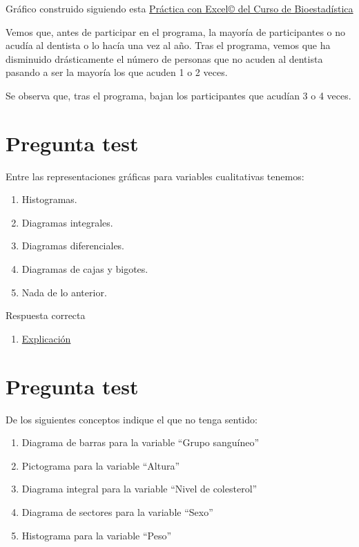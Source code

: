 \documentclass[
]{book}
\providecommand{\tightlist}{%
  \setlength{\itemsep}{0pt}\setlength{\parskip}{0pt}}
\begin{document}
Gráfico construido siguiendo esta \href{https://1fjmanzano.github.io/bioestadistica/diagramas-de-barras-y-sectores.html}{Práctica con Excel© del Curso de Bioestadística}

Vemos que, antes de participar en el programa, la mayoría de participantes o no acudía al dentista o lo hacía una vez al año. Tras el programa, vemos que ha disminuido drásticamente el número de personas que no acuden al dentista pasando a ser la mayoría los que acuden 1 o 2 veces.

Se observa que, tras el programa, bajan los participantes que acudían 3 o 4 veces.

\hypertarget{pregunta-test-56}{%
\section{Pregunta test}\label{pregunta-test-56}}

Entre las representaciones gráficas para variables cualitativas tenemos:

\begin{enumerate}
\def\labelenumi{\alph{enumi})}
\tightlist
\item
  Histogramas.
\item
  Diagramas integrales.
\item
  Diagramas diferenciales.
\item
  Diagramas de cajas y bigotes.
\item
  Nada de lo anterior.
\end{enumerate}

Respuesta correcta

\begin{enumerate}
\def\labelenumi{\alph{enumi})}
\setcounter{enumi}{3}
\tightlist
\item
  \href{https://1fjmanzano.github.io/bioestadistica/diagramas-de-barras-y-sectores.html}{Explicación}
\end{enumerate}

\hypertarget{pregunta-test-57}{%
\section{Pregunta test}\label{pregunta-test-57}}

De los siguientes conceptos indique el que no tenga sentido:

\begin{enumerate}
\def\labelenumi{\alph{enumi})}
\tightlist
\item
  Diagrama de barras para la variable ``Grupo sanguíneo''
\item
  Pictograma para la variable ``Altura''
\item
  Diagrama integral para la variable ``Nivel de colesterol''
\item
  Diagrama de sectores para la variable ``Sexo''
\item
  Histograma para la variable ``Peso''
\end{enumerate}
\end{document}
